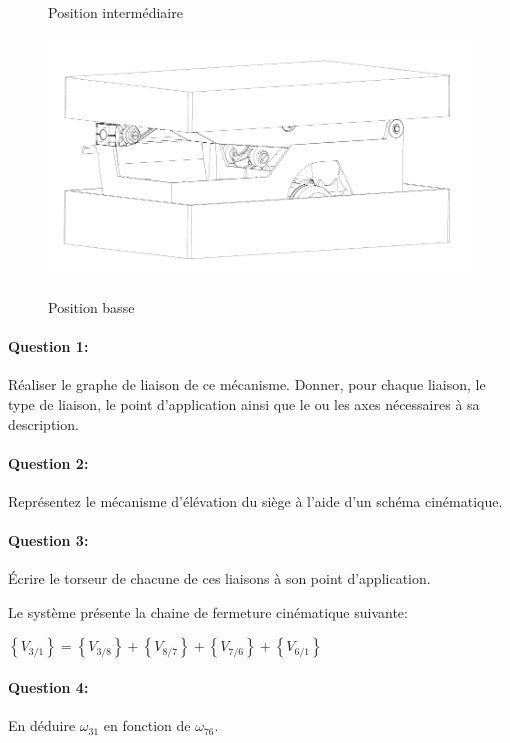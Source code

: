 \begin{figure}[htbp]
\begin{minipage}[c]{.4\linewidth}
\begin{center}
\caption{Position intermédiaire}
\label{fig:image5}
\includegraphics[width=\linewidth]{img/pos_basse.png}
\caption{Position basse}
\label{fig:image6}
\end{center}
\end{minipage}
\end{figure}

\paragraph{Question 1:} Réaliser le graphe de liaison de ce mécanisme. Donner, pour chaque liaison, le type de liaison, le point d'application ainsi que le ou les axes nécessaires à sa description.

\paragraph{Question 2:} Représentez le mécanisme d'élévation du siège à l'aide d'un schéma cinématique.

\paragraph{Question 3:} Écrire le torseur de chacune de ces liaisons à son point d'application.

Le système présente la chaine de fermeture cinématique suivante:

\begin{math}
\left\{V_{3/1}\right\}=\left\{V_{3/8}\right\}+\left\{V_{8/7}\right\}+\left\{V_{7/6}\right\}+\left\{V_{6/1}\right\}
\end{math}

\paragraph{Question 4:} En déduire $\omega_{31}$ en fonction de $\omega_{76}$.

